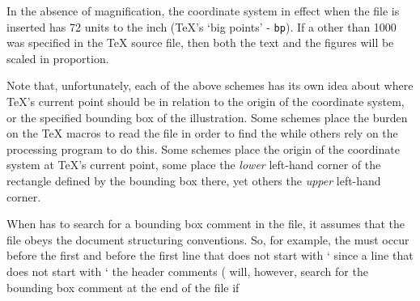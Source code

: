 \endbullets



In the absence of magnification, %
the coordinate system in effect when
the {\EPS} file is inserted has 72 units to the inch 
({\TeX}'s `big points' - {\tt bp}).
If a \verb@\magnification@ other than 1000 was specified in the {\TeX}
source file, then both the text and the {\PS} figures will be
scaled in proportion.  %

Note that, unfortunately, each of the above schemes has its own idea about
where {\TeX}'s current point should be in relation to the origin of the
coordinate system, or the specified bounding box of the illustration.
Some schemes place the burden on the {\TeX} macros to read the {\EPS} file 
in order to find the \verb@%%BoundingBox@ comment, 
while others rely on the {\DVI} processing program to do this.
Some schemes place the origin of the coordinate system 
at {\TeX}'s current point,
some place the {\it lower\/} left-hand corner of the rectangle defined by the
bounding box there, yet others the {\it upper\/} left-hand corner.

When {\DVIPSONE} has to search for a bounding box comment in the
{\EPS} file, it assumes that the file obeys the {\EPS} 
document structuring conventions. %
So, for example, the \verb@%%BoundingBox:@ line
must occur before the first \verb@%%EndComments@ line, 
and before the first line that does not start with `\verb@%%@',
since a line that does not start with `\verb@%%@' signals the end of
the header comments %
({\DVIPSONE} will, however, search for the bounding box comment at the
end of the file if \verb@%%BoundingBox: (at end)@ is used).



